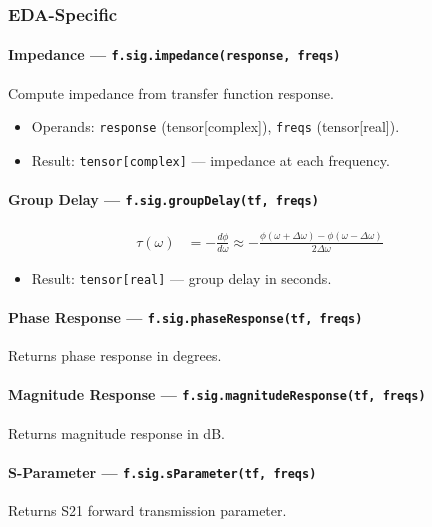 \subsubsection{EDA-Specific}

\paragraph{Impedance --- \texttt{f.sig.impedance(response, freqs)}}
Compute impedance from transfer function response.

\begin{itemize}
\item Operands: \texttt{response} (tensor[complex]), \texttt{freqs} (tensor[real]).
\item Result: \texttt{tensor[complex]} --- impedance at each frequency.
\end{itemize}

\paragraph{Group Delay --- \texttt{f.sig.groupDelay(tf, freqs)}}

\begin{align}
\tau(\omega) &= -\frac{d\phi}{d\omega} \approx -\frac{\phi(\omega + \Delta\omega) - \phi(\omega - \Delta\omega)}{2\Delta\omega} \label{eq:sig-group-delay}
\end{align}

\begin{itemize}
\item Result: \texttt{tensor[real]} --- group delay in seconds.
\end{itemize}

\paragraph{Phase Response --- \texttt{f.sig.phaseResponse(tf, freqs)}}
Returns phase response in degrees.

\paragraph{Magnitude Response --- \texttt{f.sig.magnitudeResponse(tf, freqs)}}
Returns magnitude response in dB.

\paragraph{S-Parameter --- \texttt{f.sig.sParameter(tf, freqs)}}
Returns S21 forward transmission parameter.

